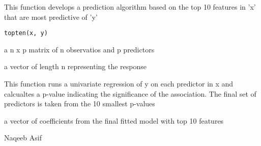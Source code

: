 \documentclass[a4paper]{book}
\begin{document}
%
\begin{Description}\relax
This function develops a prediction algorithm based on the top 10 features
in 'x' that are most predictive of 'y'
\end{Description}
%
\begin{Usage}
\begin{verbatim}
topten(x, y)
\end{verbatim}
\end{Usage}
%
\begin{Arguments}
\begin{ldescription}
\item[\code{x}] a n x p matrix of n observatios and p predictors

\item[\code{y}] a vector of length n representing the response
\end{ldescription}
\end{Arguments}
%
\begin{Details}\relax
This function runs a univariate regression of y on each predictor in x and
calcualtes a p-value indicating the significance of the association. The
final set of predictors is taken from the 10 smallest p-values
\end{Details}
%
\begin{Value}
a vector of coefficients from the final fitted model with top 10 features
\end{Value}
%
\begin{Author}\relax
Naqeeb Asif
\end{Author}
%
\begin{SeeAlso}\relax
{}
\end{SeeAlso}
\printindex{}
\end{document}

